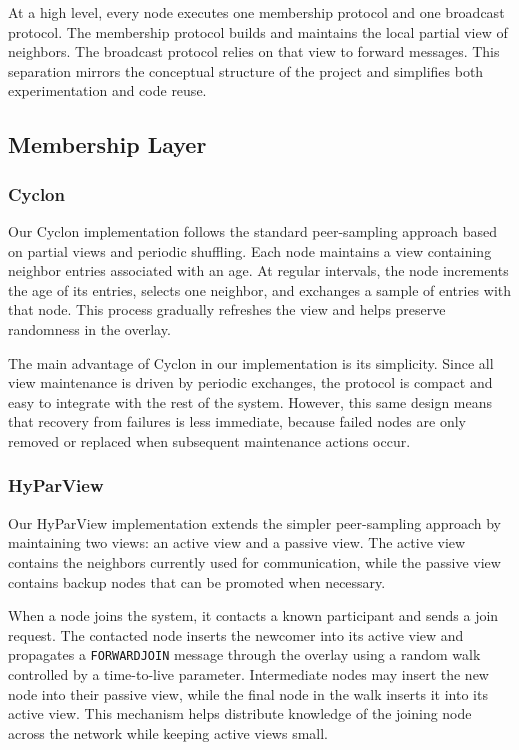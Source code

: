 \documentclass[sigconf,a4paper]{acmart}
\begin{document}
At a high level, every node executes one membership protocol and one
broadcast protocol. The membership protocol builds and maintains the
local partial view of neighbors. The broadcast protocol relies on that
view to forward messages. This separation mirrors the conceptual
structure of the project and simplifies both experimentation and code
reuse.

\subsection{Membership Layer}

\subsubsection{Cyclon}

Our Cyclon implementation follows the standard peer-sampling approach
based on partial views and periodic shuffling. Each node maintains a
view containing neighbor entries associated with an age. At regular
intervals, the node increments the age of its entries, selects one
neighbor, and exchanges a sample of entries with that node. This process
gradually refreshes the view and helps preserve randomness in the
overlay.

The main advantage of Cyclon in our implementation is its simplicity.
Since all view maintenance is driven by periodic exchanges, the protocol
is compact and easy to integrate with the rest of the system. However,
this same design means that recovery from failures is less immediate,
because failed nodes are only removed or replaced when subsequent
maintenance actions occur.

\subsubsection{HyParView}

Our HyParView implementation extends the simpler peer-sampling approach
by maintaining two views: an active view and a passive view. The active
view contains the neighbors currently used for communication, while the
passive view contains backup nodes that can be promoted when necessary.

When a node joins the system, it contacts a known participant and sends a
join request. The contacted node inserts the newcomer into its active
view and propagates a \texttt{FORWARDJOIN} message through the overlay
using a random walk controlled by a time-to-live parameter. Intermediate
nodes may insert the new node into their passive view, while the final
node in the walk inserts it into its active view. This mechanism helps
distribute knowledge of the joining node across the network while
keeping active views small.
\end{document}
